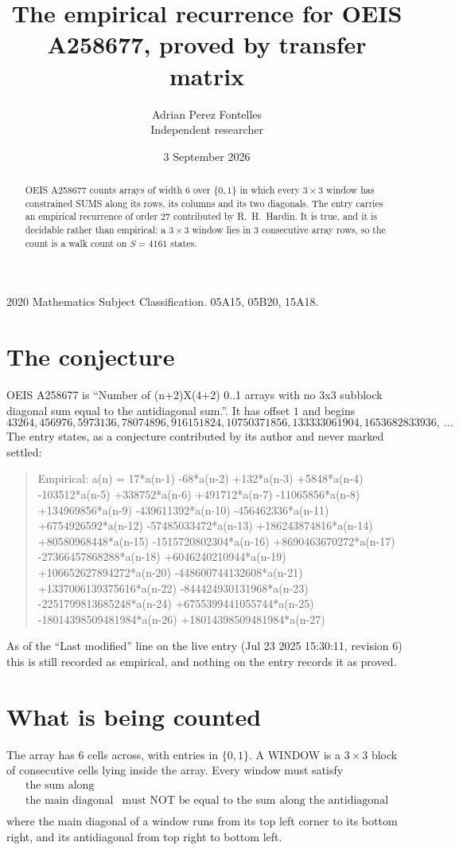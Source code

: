 \documentclass[11pt,a4paper]{article}
\title{The empirical recurrence for OEIS A258677, proved by transfer matrix}
\author{Adrian Perez Fontelles\\ \small Independent researcher}
\date{3 September 2026}
\theoremstyle{plain}
\theoremstyle{definition}
\begin{document}
\maketitle

\begin{abstract}
OEIS A258677 counts arrays of width $6$ over $\{0,1\}$ in which every $3\times3$ window has
constrained SUMS along its rows, its columns and its two diagonals. The entry carries an
empirical recurrence of order $27$ contributed by R.~H.~Hardin. It is true, and it is
decidable rather than empirical: a $3\times3$ window lies in $3$ consecutive array rows,
so the count is a walk count on $S=4161$ states.
\end{abstract}

\noindent\small 2020 Mathematics Subject Classification. 05A15, 05B20, 15A18.\normalsize

\section{The conjecture}

OEIS A258677 is ``Number of (n+2)X(4+2) 0..1 arrays with no 3x3 subblock diagonal sum equal to the antidiagonal sum.''. It has offset $1$ and begins
\[
43264, 456976, 5973136, 78074896, 916151824, 10750371856, 133333061904, 1653682833936,\ \dots
\]
The entry states, as a conjecture contributed by its author and never marked settled:
\begin{quote}
Empirical: a(n) = 17*a(n-1) -68*a(n-2) +132*a(n-3) +5848*a(n-4) -103512*a(n-5) +338752*a(n-6) +491712*a(n-7) -11065856*a(n-8) +134969856*a(n-9) -439611392*a(n-10) -456462336*a(n-11) +6754926592*a(n-12) -57485033472*a(n-13) +186243874816*a(n-14) +80580968448*a(n-15) -1515720802304*a(n-16) +8690463670272*a(n-17) -27366457868288*a(n-18) +6046240210944*a(n-19) +106652627894272*a(n-20) -448600744132608*a(n-21) +1337006139375616*a(n-22) -844424930131968*a(n-23) -2251799813685248*a(n-24) +6755399441055744*a(n-25) -18014398509481984*a(n-26) +18014398509481984*a(n-27)
\end{quote}
As of the ``Last modified'' line on the live entry (Jul 23 2025 15:30:11, revision 6) this is still
recorded as empirical, and nothing on the entry records it as proved.

\section{What is being counted}

The array has $6$ cells across, with entries in $\{0,1\}$. A WINDOW is a $3\times3$ block
of consecutive cells lying inside the array. Every window must satisfy
\[
\begin{array}{ll}
\text{the sum along} & \text{} \\[2pt]
\text{the main diagonal} & \text{must NOT be equal to the sum along the antidiagonal} \\
\end{array}
\]
where the main diagonal of a window runs from its top left corner to its bottom right, and its
antidiagonal from top right to bottom left.
\end{document}
